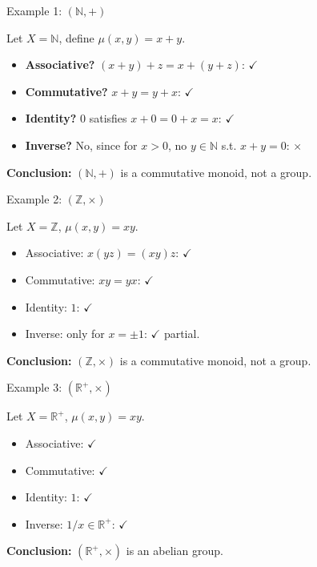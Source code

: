 \begin{frame}{Example 1: $(\mathbb{N}, +)$}
\begin{block}{}
    Let \(X = \mathbb{N}\), define \(\mu(x,y)=x+y\).

\begin{itemize}
  \item \textbf{Associative?} \((x+y)+z = x+(y+z)\): $\checkmark$
  \item \textbf{Commutative?} \(x+y = y+x\): $\checkmark$
  \item \textbf{Identity?} \(0\) satisfies \(x+0 = 0+x = x\): $\checkmark$
  \item \textbf{Inverse?} No, since for \(x>0\), no \(y\in\mathbb{N}\) s.t. \(x+y=0\): $\times$
\end{itemize}

\textbf{Conclusion:} $(\mathbb{N},+)$ is a commutative monoid, not a group.
\end{block}
\end{frame}

\begin{frame}{Example 2: $(\mathbb{Z}, \times)$}
\begin{block}{}
    Let \(X = \mathbb{Z}\), \(\mu(x,y)=xy\).

\begin{itemize}
  \item Associative: \(x(yz) = (xy)z\): $\checkmark$
  \item Commutative: \(xy = yx\): $\checkmark$
  \item Identity: \(1\): $\checkmark$
  \item Inverse: only for \(x = \pm 1\): $\checkmark$ partial.
\end{itemize}

\textbf{Conclusion:} $(\mathbb{Z},\times)$ is a commutative monoid, not a group.
\end{block}
\end{frame}

\begin{frame}{Example 3: $(\mathbb{R}^+, \times)$}
\begin{block}{}
    Let \(X = \mathbb{R}^+\), \(\mu(x,y)=xy\).

\begin{itemize}
  \item Associative: $\checkmark$
  \item Commutative: $\checkmark$
  \item Identity: \(1\): $\checkmark$
  \item Inverse: \(1/x \in \mathbb{R}^+\): $\checkmark$
\end{itemize}

\textbf{Conclusion:} $(\mathbb{R}^+, \times)$ is an abelian group.
\end{block}
\end{frame}

